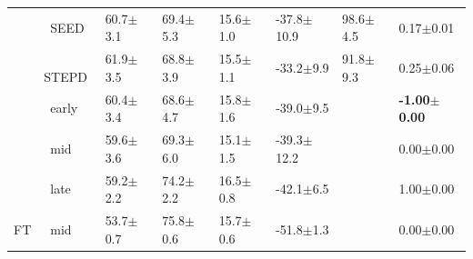 \begin{tabular}{llllllll}
 & $\ \;$SEED & 60.7\tiny{$\pm$3.1} & 69.4\tiny{$\pm$5.3} & 15.6\tiny{$\pm$1.0} & -37.8\tiny{$\pm$10.9} & 98.6\tiny{$\pm$4.5} & 0.17\tiny{$\pm$0.01} \\
 & $\ \;$STEPD & 61.9\tiny{$\pm$3.5} & 68.8\tiny{$\pm$3.9} & 15.5\tiny{$\pm$1.1} & -33.2\tiny{$\pm$9.9} & 91.8\tiny{$\pm$9.3} & 0.25\tiny{$\pm$0.06} \\
 & $\ \;$early & 60.4\tiny{$\pm$3.4} & 68.6\tiny{$\pm$4.7} & 15.8\tiny{$\pm$1.6} & -39.0\tiny{$\pm$9.5} &  & \textbf{-1.00\tiny{$\pm$0.00}} \\
 & $\ \;$mid & 59.6\tiny{$\pm$3.6} & 69.3\tiny{$\pm$6.0} & 15.1\tiny{$\pm$1.5} & -39.3\tiny{$\pm$12.2} &  & 0.00\tiny{$\pm$0.00} \\
 & $\ \;$late & 59.2\tiny{$\pm$2.2} & 74.2\tiny{$\pm$2.2} & 16.5\tiny{$\pm$0.8} & -42.1\tiny{$\pm$6.5} &  & 1.00\tiny{$\pm$0.00} \\
\midrule
FT & $\ \;$mid & 53.7\tiny{$\pm$0.7} & 75.8\tiny{$\pm$0.6} & 15.7\tiny{$\pm$0.6} & -51.8\tiny{$\pm$1.3} &  & 0.00\tiny{$\pm$0.00} \\
\bottomrule
\end{tabular}
